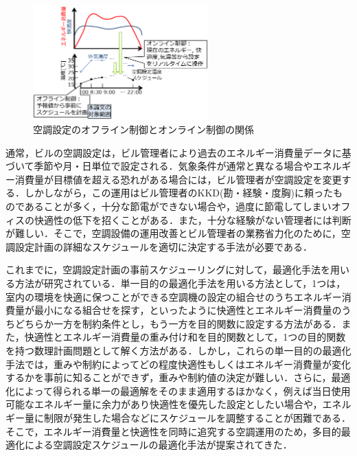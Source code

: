 \begin{figure}[ht]
    \begin{center}
        \includegraphics[width=0.6\textwidth,keepaspectratio=true]{fig/intro_offline.eps}
    \end{center}
    \caption{空調設定のオフライン制御とオンライン制御の関係}
    \label{fig::intro_offline}
\end{figure}

通常，ビルの空調設定は，ビル管理者により過去のエネルギー消費量データに基づいて季節や月・日単位で設定される．気象条件が通常と異なる場合やエネルギー消費量が目標値を超える恐れがある場合には，ビル管理者が空調設定を変更する．しかしながら，この運用はビル管理者のKKD(勘・経験・度胸)に頼ったものであることが多く，十分な節電ができない場合や，過度に節電してしまいオフィスの快適性の低下を招くことがある．また，十分な経験がない管理者には判断が難しい．そこで，空調設備の運用改善とビル管理者の業務省力化のために，空調設定計画の詳細なスケジュールを適切に決定する手法が必要である．

これまでに，空調設定計画の事前スケジューリングに対して，最適化手法を用いる方法が研究されている．単一目的の最適化手法を用いる方法として，1つは，室内の環境を快適に保つことができる空調機の設定の組合せのうちエネルギー消費量が最小になる組合せを探す，といったように快適性とエネルギー消費量のうちどちらか一方を制約条件とし，もう一方を目的関数に設定する方法がある\cite{Alhaider15, Ueda10, Xu13}．また，快適性とエネルギー消費量の重み付け和を目的関数として，1つの目的関数を持つ数理計画問題として解く方法がある\cite{Takagi11, Xiao17}．しかし，これらの単一目的の最適化手法では，重みや制約によってどの程度快適性もしくはエネルギー消費量が変化するかを事前に知ることができず，重みや制約値の決定が難しい．さらに，最適化によって得られる単一の最適解をそのまま適用するほかなく，例えば当日使用可能なエネルギー量に余力があり快適性を優先した設定としたい場合や，エネルギー量に制限が発生した場合などにスケジュールを調整することが困難である．そこで，エネルギー消費量と快適性を同時に追究する空調運用のため，多目的最適化による空調設定スケジュールの最適化手法が提案されてきた．

